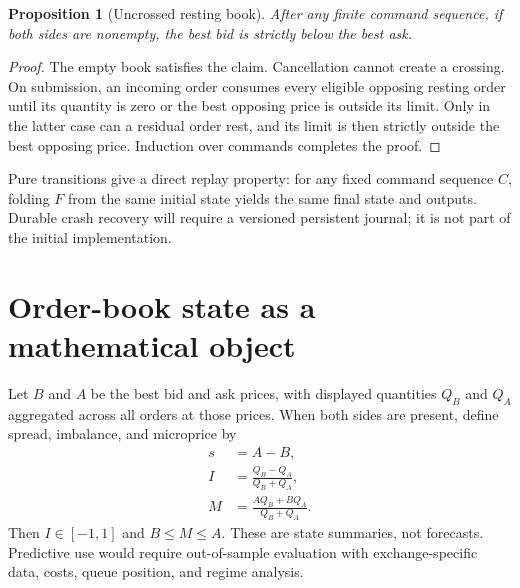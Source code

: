 \documentclass[11pt]{article}
\newtheorem{proposition}{Proposition}
\begin{document}
\begin{proposition}[Uncrossed resting book]
After any finite command sequence, if both sides are nonempty, the best bid is strictly below the best ask.
\end{proposition}
\begin{proof}
The empty book satisfies the claim. Cancellation cannot create a crossing. On submission, an incoming order consumes every eligible opposing resting order until its quantity is zero or the best opposing price is outside its limit. Only in the latter case can a residual order rest, and its limit is then strictly outside the best opposing price. Induction over commands completes the proof.
\end{proof}

Pure transitions give a direct replay property: for any fixed command sequence $C$, folding $F$ from the same initial state yields the same final state and outputs. Durable crash recovery will require a versioned persistent journal; it is not part of the initial implementation.

\section{Order-book state as a mathematical object}
Let $B$ and $A$ be the best bid and ask prices, with displayed quantities $Q_B$ and $Q_A$ aggregated across all orders at those prices. When both sides are present, define spread, imbalance, and microprice by
\begin{align}
  s &= A-B, \\
  I &= \frac{Q_B-Q_A}{Q_B+Q_A}, \\
  M &= \frac{A Q_B+B Q_A}{Q_B+Q_A}.
\end{align}
Then $I\in[-1,1]$ and $B\le M\le A$. These are state summaries, not forecasts. Predictive use would require out-of-sample evaluation with exchange-specific data, costs, queue position, and regime analysis.
\end{document}
